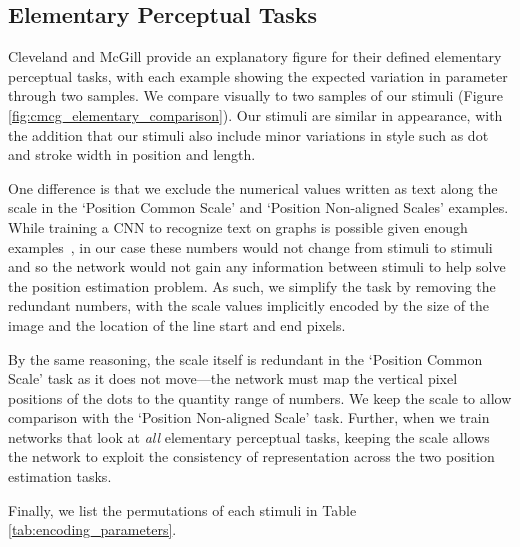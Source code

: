 \documentclass[journal]{vgtc}        %
\newcommand{\change}[1]{{#1}}
\begin{document}
\subsection{Elementary Perceptual Tasks}

\change{
Cleveland and McGill provide an explanatory figure for their defined elementary perceptual tasks, with each example showing the expected variation in parameter through two samples. We compare visually to two samples of our stimuli (Figure \ref{fig:cmcg_elementary_comparison}). Our stimuli are similar in appearance, with the addition that our stimuli also include minor variations in style such as dot and stroke width in position and length.

One difference is that we exclude the numerical values written as text along the scale in the `Position Common Scale' and `Position Non-aligned Scales' examples. While training a CNN to recognize text on graphs is possible given enough examples~\cite{kafle2018dvqa}, in our case these numbers would not change from stimuli to stimuli and so the network would not gain any information between stimuli to help solve the position estimation problem. As such, we simplify the task by removing the redundant numbers, with the scale values implicitly encoded by the size of the image and the location of the line start and end pixels.

By the same reasoning, the scale itself is redundant in the `Position Common Scale' task as it does not move---the network must map the vertical pixel positions of the dots to the quantity range of numbers. We keep the scale to allow comparison with the `Position Non-aligned Scale' task. Further, when we train networks that look at \emph{all} elementary perceptual tasks, keeping the scale allows the network to exploit the consistency of representation across the two position estimation tasks.
}

Finally, we list the permutations of each stimuli in Table \ref{tab:encoding_parameters}.
\end{document}
